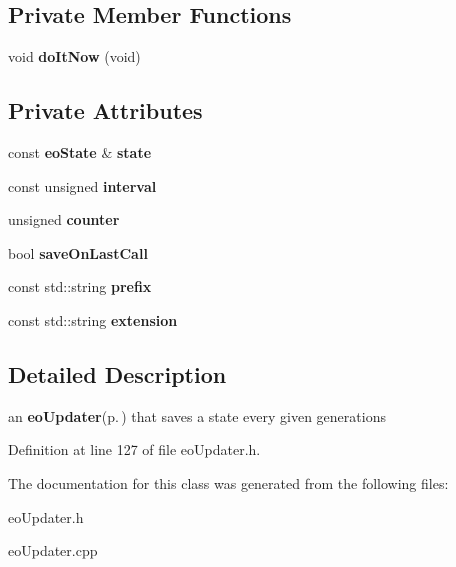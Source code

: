 \subsection*{Private Member Functions}
\begin{CompactItemize}
\item 
void {\bf do\-It\-Now} (void)\label{classeo_counted_state_saver_d0}

\end{CompactItemize}
\subsection*{Private Attributes}
\begin{CompactItemize}
\item 
const {\bf eo\-State} \& {\bf state}\label{classeo_counted_state_saver_r0}

\item 
const unsigned {\bf interval}\label{classeo_counted_state_saver_r1}

\item 
unsigned {\bf counter}\label{classeo_counted_state_saver_r2}

\item 
bool {\bf save\-On\-Last\-Call}\label{classeo_counted_state_saver_r3}

\item 
const std::string {\bf prefix}\label{classeo_counted_state_saver_r4}

\item 
const std::string {\bf extension}\label{classeo_counted_state_saver_r5}

\end{CompactItemize}


\subsection{Detailed Description}
an {\bf eo\-Updater}{\rm (p.\,\pageref{classeo_updater})} that saves a state every given generations 



Definition at line 127 of file eo\-Updater.h.

The documentation for this class was generated from the following files:\begin{CompactItemize}
\item 
eo\-Updater.h\item 
eo\-Updater.cpp\end{CompactItemize}
